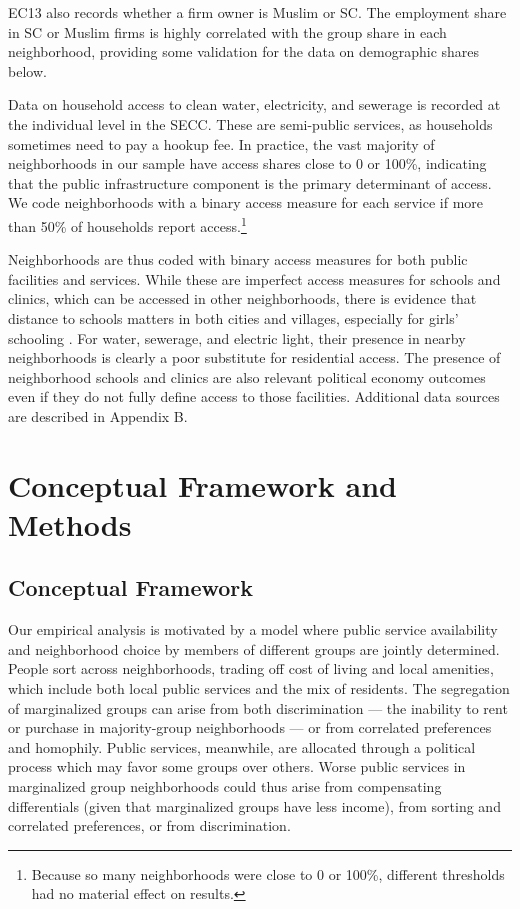 \documentclass[12pt]{article}
\begin{document}
EC13 also records whether a firm owner is Muslim or SC. The employment share in SC or Muslim firms is highly correlated with the group share in each neighborhood, providing some validation for the data on demographic shares below. 

Data on household access to clean water, electricity, and sewerage is recorded at the individual level in the SECC. These are semi-public services, as households sometimes need to pay a hookup fee. In practice, the vast majority of neighborhoods in our sample have access shares close to 0 or 100\%, indicating that the public infrastructure component is the primary determinant of access. We code neighborhoods with a binary access measure for each service if more than 50\% of households report access.\footnote{Because so many neighborhoods were close to 0 or 100\%, different thresholds had no material effect on results.}

Neighborhoods are thus coded with binary access measures for both public facilities and services. While these are imperfect access measures for schools and clinics, which can be accessed in other neighborhoods, there is evidence that distance to schools matters in both cities and villages, especially for girls' schooling \citep{chandra2007,muralidharan2013,borker2023}. For water, sewerage, and electric light, their presence in nearby neighborhoods is clearly a poor substitute for residential access. The presence of neighborhood schools and clinics are also relevant political economy outcomes even if they do not fully define access to those facilities. Additional data sources are described in Appendix B.

\section{Conceptual Framework and Methods} \label{sec:methods}

\subsection{Conceptual Framework}
\label{sec:cf}

Our empirical analysis is motivated by a model where public service availability and neighborhood choice by members of different groups are jointly determined. People sort across neighborhoods, trading off cost of living and local amenities, which include both local public services and the mix of residents. The segregation of marginalized groups can arise from both discrimination --- the inability to rent or purchase in majority-group neighborhoods --- or from correlated preferences and homophily. Public services, meanwhile, are allocated through a political process which may favor some groups over others. Worse public services in marginalized group neighborhoods could thus arise from compensating differentials (given that marginalized groups have less income), from sorting and correlated preferences, or from discrimination.
\end{document}
